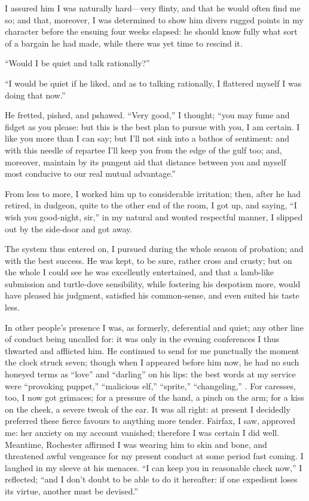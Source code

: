 I assured him I was naturally hard---very flinty, and that he would
often find me so; and that, moreover, I was determined to show him
divers rugged points in my character before the ensuing four weeks
elapsed: he should know fully what sort of a bargain he had made, while
there was yet time to rescind it.

\enquote{Would I be quiet and talk rationally?}

\enquote{I would be quiet if he liked, and as to talking rationally, I
	flattered myself I was doing that now.}

He fretted, pished, and pshawed.  \enquote{Very good,} I thought;
\enquote{you may fume and fidget as you please: but this is the best
	plan to pursue with you, I am certain.  I like you more than I can say;
	but I'll not sink into a bathos of sentiment: and with this needle of
	repartee I'll keep you from the edge of the gulf too; and, moreover,
	maintain by its pungent aid that distance between you and myself most
	conducive to our real mutual advantage.}

From less to more, I worked him up to considerable irritation; then,
after he had retired, in dudgeon, quite to the other end of the room, I
got up, and saying, \enquote{I wish you good-night, sir,} in my natural
and wonted respectful manner, I slipped out by the side-door and got
away.

The system thus entered on, I pursued during the whole season of
probation; and with the best success.  He was kept, to be sure, rather
cross and crusty; but on the whole I could see he was excellently
entertained, and that a lamb-like submission and turtle-dove
sensibility, while fostering his despotism more, would have pleased his
judgment, satisfied his common-sense, and even suited his taste less.

In other people's presence I was, as formerly, deferential and quiet;
any other line of conduct being uncalled for: it was only in the evening
conferences I thus thwarted and afflicted him.  He continued to send for
me punctually the moment the clock struck seven; though when I appeared
before him now, he had no such honeyed terms as \enquote{love} and
\enquote{darling} on his lips: the best words at my service were
\enquote{provoking puppet,} \enquote{malicious elf,} \enquote{sprite,}
\enquote{changeling,} \etc.  For caresses, too, I now got grimaces; for a
pressure of the hand, a pinch on the arm; for a kiss on the cheek, a
severe tweak of the ear.  It was all right: at present I decidedly
preferred these fierce favours to anything more tender.  \Mrs{} Fairfax, I
saw, approved me: her anxiety on my account vanished; therefore I was
certain I did well.  Meantime, \Mr{} Rochester affirmed I was wearing him
to skin and bone, and threatened awful vengeance for my present conduct
at some period fast coming.  I laughed in my sleeve at his menaces.
\enquote{I can keep you in reasonable check now,} I reflected;
\enquote{and I don't doubt to be able to do it hereafter: if one
	expedient loses its virtue, another must be devised.}

